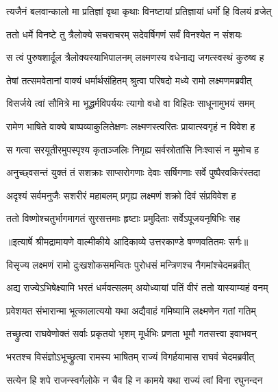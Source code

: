 \twolineshloka
{त्यजैनं बलवान्कालो मा प्रतिज्ञां वृथा कृथाः}
{विनष्टायां प्रतिज्ञायां धर्मो हि विलयं व्रजेत्} %

\twolineshloka
{ततो धर्मे विनष्टे तु त्रैलोक्ये सचराचरम्}
{सदेवर्षिगणं सर्वं विनश्येत न संशयः} %

\twolineshloka
{स त्वं पुरुषशार्दूल त्रैलोक्यस्याभिपालनम्}
{लक्ष्मणस्य वधेनाद्य जगत्स्वस्थं कुरुष्व ह} %

\twolineshloka
{तेषां तत्समवेतानां वाक्यं धर्मार्थसंहितम्}
{श्रुत्वा परिषदो मध्ये रामो लक्ष्मणमब्रवीत्} %

\twolineshloka
{विसर्जये त्वां सौमित्रे मा भूद्धर्मविपर्ययः}
{त्यागो वधो वा विहितः साधूनामुभयं समम्} %

\twolineshloka
{रामेण भाषिते वाक्ये बाष्पव्याकुलितेक्षणः}
{लक्ष्मणस्त्वरितः प्रायात्स्वगृहं न विवेश ह} %

\twolineshloka
{स गत्वा सरयूतीरमुपस्पृश्य कृताञ्जलिः}
{निगृह्य सर्वस्रोतांसि निःश्वासं न मुमोच ह} %

\twolineshloka
{अनुच्छ्वसन्तं युक्तं तं सशक्राः साप्सरोगणाः}
{देवाः सर्षिगणाः सर्वे पुष्पैरवकिरंस्तदा} %

\twolineshloka
{अदृश्यं सर्वमनुजैः सशरीरं महाबलम्}
{प्रगृह्य लक्ष्मणं शक्रो दिवं संप्रविवेश ह} %

\twolineshloka
{ततो विष्णोश्चतुर्भागमागतं सुरसत्तमाः}
{हृष्टाः प्रमुदिताः सर्वेऽपूजयनृषिभिः सह} %


{॥इत्यार्षे श्रीमद्रामायणे वाल्मीकीये आदिकाव्ये उत्तरकाण्डे षण्णवतितमः सर्गः॥}


\twolineshloka
{विसृज्य लक्ष्मणं रामो दुःखशोकसमन्वितः}
{पुरोधसं मन्त्रिणश्च नैगमांश्चेदमब्रवीत्} %

\twolineshloka
{अद्य राज्येऽभिषेक्ष्यामि भरतं धर्मवत्सलम्}
{अयोध्यायां पतिं वीरं ततो यास्याम्यहं वनम्} %

\twolineshloka
{प्रवेशयत संभारान्मा भूत्कालात्ययो यथा}
{अद्यैवाहं गमिष्यामि लक्ष्मणेन गतां गतिम्} %

\twolineshloka
{तच्छ्रुत्वा राघवेणोक्तं सर्वाः प्रकृतयो भृशम्}
{मूर्धभिः प्रणता भूमौ गतसत्त्वा इवाभवन्} %

\twolineshloka
{भरतश्च विसंज्ञोऽभूच्छ्रुत्वा रामस्य भाषितम्}
{राज्यं विगर्हयामास राघवं चेदमब्रवीत्} %

\twolineshloka
{सत्येन हि शपे राजन्स्वर्गलोके न चैव हि}
{न कामये यथा राज्यं त्वां विना रघुनन्दन} %

